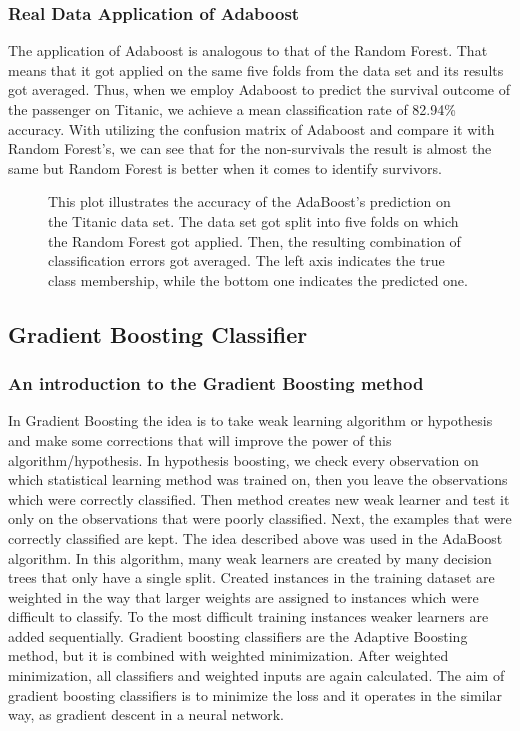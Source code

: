\subsubsection{Real Data Application of Adaboost}
The application of Adaboost is analogous to that of the Random Forest. 
That means that it got applied on the same five folds from the data set and its results got averaged.
Thus, when we employ Adaboost to predict the survival outcome of the passenger on Titanic, 
we achieve a mean classification rate of 82.94\% accuracy. With utilizing the confusion matrix of Adaboost 
and compare it with Random Forest's, we can see that for the non-survivals the result is almost the same 
but Random Forest is better when it comes to identify survivors.

\begin{figure}[H]
    \captionsetup{format=plain}
    \caption
        {This plot illustrates the accuracy of the AdaBoost's prediction on the Titanic data set.
        The data set got split into five folds on which the Random Forest got applied. 
        Then, the resulting combination of classification errors got averaged.
        The left axis indicates the true class membership, while the bottom one indicates the predicted one.
        }
    \label{fig:confusion_matrix_adaboost}
\end{figure}


\subsection{Gradient Boosting Classifier}
\label{sec:gradient_boosting}

\subsubsection{An introduction to the Gradient Boosting method}
In Gradient Boosting the idea is to take weak learning algorithm or hypothesis and make some corrections that will improve the power of this algorithm/hypothesis. In hypothesis boosting, we check every observation on which statistical learning method was trained on, then you leave the observations which were correctly classified. Then method creates new weak learner and test it only on the observations that were poorly classified. Next, the examples that were correctly classified are kept.
The idea described above was used in the AdaBoost algorithm. In this algorithm, many weak learners are created by many decision trees that only have a single split. Created instances in the training dataset are weighted in the way that larger weights are assigned to instances which were difficult to classify. To the most difficult training instances weaker learners are added sequentially.
Gradient boosting classifiers are the Adaptive Boosting method, but it is combined with weighted minimization. After weighted minimization, all classifiers and weighted inputs are again calculated. The aim of gradient boosting classifiers is to minimize the loss and it operates in the similar way, as gradient descent in a neural network.

